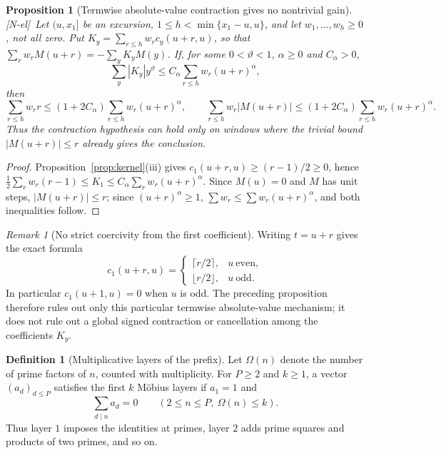 \documentclass[11pt,reqno]{amsart}
\numberwithin{equation}{section}
\theoremstyle{plain}
\newtheorem{proposition}[theorem]{Proposition}
\theoremstyle{definition}
\newtheorem{definition}[theorem]{Definition}
\theoremstyle{remark}
\newtheorem{remark}[theorem]{Remark}
\newcommand{\tagNE}{\textup{[N-el]}}
\begin{document}
\begin{proposition}[Termwise absolute-value contraction gives no nontrivial gain]
\label{prop:cone-obstruction}
\tagNE\ Let $(u,x_1]$ be an excursion, $1\le h<\min\{x_1-u,u\}$, and let
$w_1,\dots,w_h\ge0$, not all zero. Put
$K_y=\sum_{r\le h}w_rc_y(u+r,u)$, so that
$\sum_rw_rM(u+r)=-\sum_yK_yM(y)$. If, for some $0<\vartheta<1$, $\alpha\ge0$ and
$C_\alpha>0$,
\begin{equation}
\sum_y|K_y|y^\vartheta\le C_\alpha\sum_{r\le h}w_r(u+r)^\alpha,
\end{equation}
then
\begin{equation}
\sum_{r\le h}w_rr\le(1+2C_\alpha)\sum_{r\le h}w_r(u+r)^\alpha,
\qquad
\sum_{r\le h}w_r|M(u+r)|
\le(1+2C_\alpha)\sum_{r\le h}w_r(u+r)^\alpha.
\end{equation}
Thus the contraction hypothesis can hold only on windows where the trivial
bound $|M(u+r)|\le r$ already gives the conclusion.
\end{proposition}

\begin{proof}
Proposition~\ref{prop:kernel}(iii) gives
$c_1(u+r,u)\ge(r-1)/2\ge0$, hence
$\frac12\sum_rw_r(r-1)\le K_1\le
C_\alpha\sum_rw_r(u+r)^\alpha$. Since $M(u)=0$ and $M$ has unit steps,
$|M(u+r)|\le r$; since $(u+r)^\alpha\ge1$, $\sum w_r\le\sum w_r(u+r)^\alpha$, and both inequalities follow.
\end{proof}

\begin{remark}[No strict coercivity from the first coefficient]
\label{rem:c1-parity}
Writing $t=u+r$ gives the exact formula
\begin{equation}
c_1(u+r,u)=
\begin{cases}
\lceil r/2\rceil,&u\ \text{even},\\
\lfloor r/2\rfloor,&u\ \text{odd}.
\end{cases}
\end{equation}
In particular $c_1(u+1,u)=0$ when $u$ is odd.  The preceding proposition
therefore rules out only this particular termwise absolute-value mechanism;
it does not rule out a global signed contraction or cancellation among the
coefficients $K_y$.
\end{remark}

\begin{definition}[Multiplicative layers of the prefix]
\label{def:multiplicative-layers}
Let $\Omega(n)$ denote the number of prime factors of $n$, counted with
multiplicity.  For $P\ge2$ and $k\ge1$, a vector
$(a_d)_{d\le P}$ satisfies the first $k$ M\"obius layers if
$a_1=1$ and
\begin{equation}
\sum_{d\mid n}a_d=0
\qquad(2\le n\le P,\ \Omega(n)\le k).
\end{equation}
Thus layer $1$ imposes the identities at primes, layer $2$ adds prime
squares and products of two primes, and so on.
\end{definition}
\end{document}
